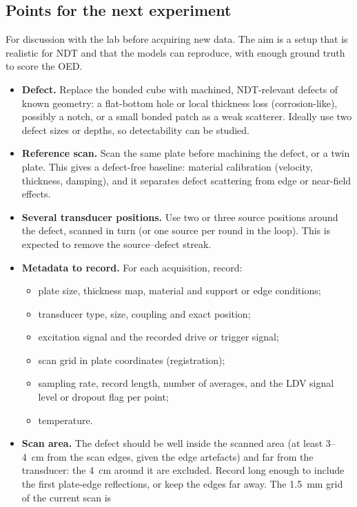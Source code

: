 \documentclass[11pt,a4paper]{article}
\begin{document}
\subsection{Points for the next experiment}\label{sec:next-experiment}
For discussion with the lab before acquiring new data. The aim is a setup that is realistic for NDT and that the
models can reproduce, with enough ground truth to score the OED.
\begin{itemize}
  \item \textbf{Defect.} Replace the bonded cube with machined, NDT-relevant defects of known geometry: a flat-bottom
        hole or local thickness loss (corrosion-like), possibly a notch, or a small bonded patch as a weak scatterer.
        Ideally use two defect sizes or depths, so detectability can be studied.
  \item \textbf{Reference scan.} Scan the same plate before machining the defect, or a twin plate. This gives a
        defect-free baseline: material calibration (velocity, thickness, damping), and it separates
        defect scattering from edge or near-field effects.
  \item \textbf{Several transducer positions.} Use two or three source positions around the defect, scanned in turn
        (or one source per round in the loop). This is expected to remove the source--defect streak.
  \item \textbf{Metadata to record.} For each acquisition, record:
        \begin{itemize}
          \item plate size, thickness map, material and support or edge conditions;
          \item transducer type, size, coupling and exact position;
          \item excitation signal and the recorded drive or trigger signal;
          \item scan grid in plate coordinates (registration);
          \item sampling rate, record length, number of averages, and the LDV signal level or dropout flag per point;
          \item temperature.
        \end{itemize}
  \item \textbf{Scan area.} The defect should be well inside the scanned area (at least 3--4~cm from the scan edges,
        given the edge artefacts) and far from the transducer: the 4~cm around it are excluded. Record long enough to
        include the first plate-edge reflections, or keep the edges far away. The 1.5~mm grid of the current scan is

\end{itemize}
\end{document}
